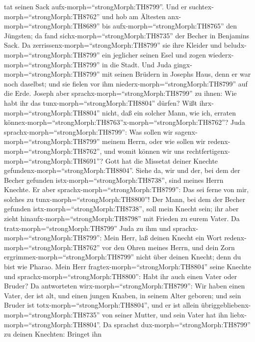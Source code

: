 tat seinen Sack aufx-morph=``strongMorph:TH8799''.  Und er
suchtex-morph=``strongMorph:TH8762'' und hob am Ältesten
anx-morph=``strongMorph:TH8689'' bis aufx-morph=``strongMorph:TH8765''
den Jüngsten; da fand sichx-morph=``strongMorph:TH8735'' der Becher in
Benjamins Sack.  Da zerrissenx-morph=``strongMorph:TH8799''
sie ihre Kleider und beludx-morph=``strongMorph:TH8799'' ein jeglicher
seinen Esel und zogen wiederx-morph=``strongMorph:TH8799'' in die Stadt.
 Und Juda gingx-morph=``strongMorph:TH8799'' mit seinen
Brüdern in Josephs Haus, denn er war noch daselbst; und sie fielen vor
ihm niederx-morph=``strongMorph:TH8799'' auf die Erde. 
Joseph aber sprachx-morph=``strongMorph:TH8799'' zu ihnen: Wie habt ihr
das tunx-morph=``strongMorph:TH8804'' dürfen? Wißt
ihrx-morph=``strongMorph:TH8804'' nicht, daß ein solcher Mann, wie ich,
erraten
könnex-morph=``strongMorph:TH8763''x-morph=``strongMorph:TH8762''?
 Juda sprachx-morph=``strongMorph:TH8799'': Was sollen wir
sagenx-morph=``strongMorph:TH8799'' meinem Herrn, oder wie sollen wir
redenx-morph=``strongMorph:TH8762'', und womit können wir uns
rechtfertigenx-morph=``strongMorph:TH8691''? Gott hat die Missetat
deiner Knechte gefundenx-morph=``strongMorph:TH8804''. Siehe da, wir und
der, bei dem der Becher gefunden istx-morph=``strongMorph:TH8738'', sind
meines Herrn Knechte.  Er aber
sprachx-morph=``strongMorph:TH8799'': Das sei ferne von mir, solches zu
tunx-morph=``strongMorph:TH8800''! Der Mann, bei dem der Becher gefunden
istx-morph=``strongMorph:TH8738'', soll mein Knecht sein; ihr aber zieht
hinaufx-morph=``strongMorph:TH8798'' mit Frieden zu eurem Vater.
 Da tratx-morph=``strongMorph:TH8799'' Juda zu ihm und
sprachx-morph=``strongMorph:TH8799'': Mein Herr, laß deinen Knecht ein
Wort redenx-morph=``strongMorph:TH8762'' vor den Ohren meines Herrn, und
dein Zorn ergrimmex-morph=``strongMorph:TH8799'' nicht über deinen
Knecht; denn du bist wie Pharao.  Mein Herr
fragtex-morph=``strongMorph:TH8804'' seine Knechte und
sprachx-morph=``strongMorph:TH8800'': Habt ihr auch einen Vater oder
Bruder?  Da antworteten wirx-morph=``strongMorph:TH8799'':
Wir haben einen Vater, der ist alt, und einen jungen Knaben, in seinem
Alter geboren; und sein Bruder ist totx-morph=``strongMorph:TH8804'',
und er ist allein übriggebliebenx-morph=``strongMorph:TH8735'' von
seiner Mutter, und sein Vater hat ihn
liebx-morph=``strongMorph:TH8804''.  Da sprachst
dux-morph=``strongMorph:TH8799'' zu deinen Knechten: Bringet ihn
